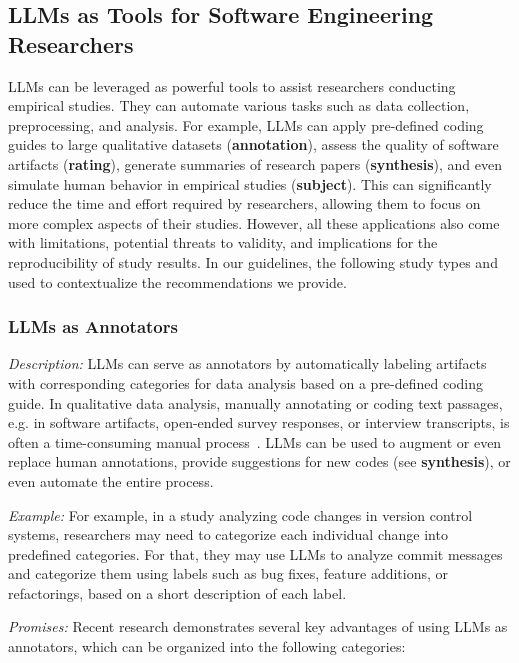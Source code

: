 \documentclass[11pt]{article}
\begin{document}
\subsection{LLMs as Tools for Software Engineering Researchers}

LLMs can be leveraged as powerful tools to assist researchers conducting empirical studies.
They can automate various tasks such as data collection, preprocessing, and analysis.
For example, LLMs can apply pre-defined coding guides to large qualitative datasets (\textbf{annotation}), assess the quality of software artifacts (\textbf{rating}), generate summaries of research papers (\textbf{synthesis}), and even simulate human behavior in empirical studies (\textbf{subject}).
This can significantly reduce the time and effort required by researchers, allowing them to focus on more complex aspects of their studies.
However, all these applications also come with limitations, potential threats to validity, and implications for the reproducibility of study results.
In our guidelines, the following study types and used to contextualize the recommendations we provide.


\subsubsection{LLMs as Annotators}

\emph{Description:} LLMs can serve as annotators by automatically labeling artifacts with corresponding categories for data analysis based on a pre-defined coding guide.
In qualitative data analysis, manually annotating or coding text passages, e.g. in software artifacts, open-ended survey responses, or interview transcripts, is often a time-consuming manual process~\cite{DBLP:journals/ase/BanoHZT24}.
LLMs can be used to augment or even replace human annotations, provide suggestions for new codes (see \textbf{synthesis}), or even automate the entire process.

\emph{Example:} For example, in a study analyzing code changes in version control systems, researchers may need to categorize each individual change into predefined categories.
For that, they may use LLMs to analyze commit messages and categorize them using labels such as bug fixes, feature additions, or refactorings, based on a short description of each label.

\emph{Promises:} Recent research demonstrates several key advantages of using LLMs as annotators, which can be organized into the following categories:
\end{document}
